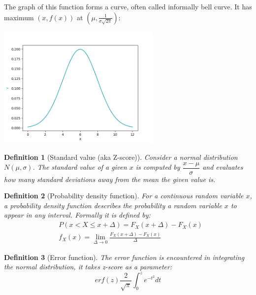 \documentclass[11pt, a4paper]{article}
\newtheorem{definition}{Definition}
\begin{document}
		The graph of this function forms a curve, often called informally bell curve. It has maximum $(x,f(x))$ at $(\mu, \frac{1}{\sigma\sqrt{2\pi}})$:
		\begin{center}
			\includegraphics[width=0.6\textwidth]{Normal_clean}
		\end{center}
		
		\begin{definition}[Standard value (aka Z-score)]
			\label{def:def2}
			Consider a normal distribution $N(\mu, \sigma)$. The standard value of a given $x$ is computed by $\dfrac{x-\mu}{\sigma}$ and evaluates how many standard deviations away from the mean the given value is.
		\end{definition}
	
		\begin{definition}[Probability density function]
			\label{def:def3}
			For a continuous random variable $x$, a probability density function describes the probability a random variable $x$ to appear in any interval. Formally it is defined by:
			\begin{align*}
				&P(x < X \leq x+\Delta)=F_X(x+\Delta)-F_X(x)\\
				&f_X(x)=\lim_{\Delta \rightarrow 0} \frac{F_X(x+\Delta)-F_X(x)}{\Delta}			
			\end{align*}
		\end{definition}
	
		\begin{definition}[Error function] The error function is encountered in integrating the normal distribution, it takes z-score as a parameter:
			$$erf(z) \dfrac{2}{\sqrt{\pi}}\int_{0}^{z}e^{-t^{2}}dt$$
		\end{definition}
	
\end{document}
